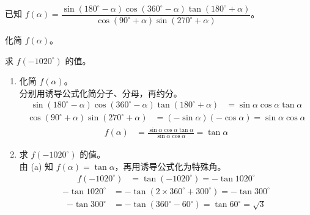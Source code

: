 \documentclass[12pt,a4paper]{exam-zh}
\begin{document}
\makeexamheader

\begin{question}[points = 6]
    已知
       $f(\alpha)=\dfrac{\sin(180^{\circ}-\alpha)\cos(360^{\circ}-\alpha)\tan(180^{\circ}+\alpha)}{\cos(90^{\circ}+\alpha)\sin(270^{\circ}+\alpha)}$。 
    \begin{questionparts}
        \item 化简 $f(\alpha)$。 

        \item 求 $f(-1020^{\circ})$ 的值。 
    \end{questionparts}
\end{question}

\begin{solution}
    \begin{enumerate}[label=(\alph*)]
        \item 化简 $f(\alpha)$。 \\
        分别用诱导公式化简分子、分母，再约分。 \\
        \begin{align*}
            \sin(180^{\circ}-\alpha)\cos(360^{\circ}-\alpha)\tan(180^{\circ}+\alpha) &= \sin\alpha\cos\alpha\tan\alpha
        \end{align*}
        \begin{align*}
            \cos(90^{\circ}+\alpha)\sin(270^{\circ}+\alpha) &= (-\sin\alpha)(-\cos\alpha) = \sin\alpha\cos\alpha
        \end{align*}
        \begin{align*}
            f(\alpha) &= \frac{\sin\alpha\cos\alpha\tan\alpha}{\sin\alpha\cos\alpha} = \tan\alpha
        \end{align*}

        \item 求 $f(-1020^{\circ})$ 的值。 \\
        由 (a) 知 $f(\alpha)=\tan\alpha$，再用诱导公式化为特殊角。 \\
        \begin{align*}
            f(-1020^{\circ}) &= \tan(-1020^{\circ}) = -\tan 1020^{\circ}
        \end{align*}
        \begin{align*}
            -\tan 1020^{\circ} &= -\tan(2\times 360^{\circ}+300^{\circ}) = -\tan 300^{\circ}
        \end{align*}
        \begin{align*}
            -\tan 300^{\circ} &= -\tan(360^{\circ}-60^{\circ}) = \tan 60^{\circ} = \sqrt{3}
        \end{align*}
    \end{enumerate}
\end{solution}
\end{document}
